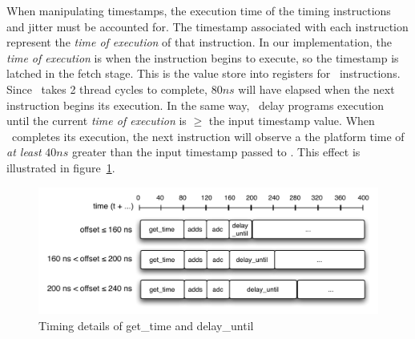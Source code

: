 When manipulating timestamps, the execution time of the timing instructions and jitter must be accounted for.
The timestamp associated with each instruction represent the \emph{time of execution} of that instruction.
In our implementation, the \emph{time of execution} is when the instruction begins to execute, so the timestamp is latched in the fetch stage.
This is the value store into registers for \gettime\ instructions.  
Since \gettime\ takes 2 thread cycles to complete, $80ns$  will have elapsed when the next instruction begins its execution.
In the same way, \delayuntil\ delay programs execution until the current \emph{time of execution} is $\geq$ the input timestamp value.
When \delayuntil\ completes its execution, the next instruction will observe a the platform time of \emph{at least} $40ns$ greater than the input timestamp passed to \delayuntil.
This effect is illustrated in figure~\ref{fig:delay_until_details}.
\begin{figure}[h]
  \begin{center}
    \includegraphics[scale=.7]{figs/delay_until_details}
  \end{center}
  \vspace{-3mm}
  \caption{Timing details of get\_time and delay\_until}
  \label{fig:delay_until_details}
\end{figure}


